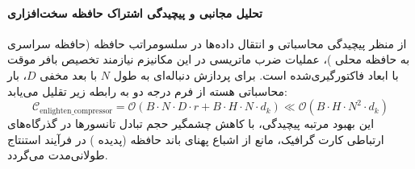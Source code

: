 \paragraph{تحلیل مجانبی و پیچیدگی اشتراک حافظه سخت‌افزاری}
از منظر پیچیدگی محاسباتی و انتقال داده‌ها در سلسومراتب حافظه (حافظه سراسری  به حافظه محلی )، عملیات ضرب ماتریسی در این مکانیزم نیازمند تخصیص بافر موقت با ابعاد فاکتورگیری‌شده است. برای پردازش دنباله‌ای به طول $N$ با بعد مخفی $D$، بار محاسباتی هسته از فرم درجه دو به رابطه زیر تقلیل می‌یابد:
\begin{equation}
\label{eq:complexity_enlighten_compressor}
\mathcal{C}_{\text{enlighten\_compressor}} = \mathcal{O}\left( B \cdot N \cdot D \cdot r + B \cdot H \cdot N \cdot d_k \right) \ll \mathcal{O}\left( B \cdot H \cdot N^2 \cdot d_k \right)
\end{equation}
این بهبود مرتبه پیچیدگی، با کاهش چشمگیر حجم تبادل تانسورها در گذرگاه‌های ارتباطی کارت گرافیک، مانع از اشباع پهنای باند حافظه (پدیده ) در فرآیند استنتاج طولانی‌مدت می‌گردد.
